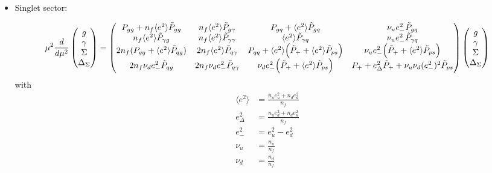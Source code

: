 \documentclass[a4paper,oneside]{article}
\begin{document}
\begin{itemize}
\item Singlet sector:

\begin{equation*}
\mu^2\frac{d}{d\mu^2}
\begin{pmatrix}
g \\
\gamma \\
\Sigma \\
\Delta_\Sigma
\end{pmatrix}
=
\begin{pmatrix}
 P_{gg}+n_f \langle e^2\rangle \tilde{P}_{gg} & n_f \langle e^2\rangle \tilde{P}_{g\gamma} & P_{gq} + \langle e^2\rangle \tilde{P}_{gq} & \nu_ue^2_-\tilde{P}_{gq} \\
 n_f \langle e^2\rangle \tilde{P}_{\gamma g} & n_f \langle e^2\rangle \tilde{P}_{\gamma \gamma} & \langle e^2\rangle \tilde{P}_{\gamma q} & \nu_ue^2_-\tilde{P}_{\gamma q} \\
 2n_f (P_{qg} +\langle e^2\rangle  \tilde{P}_{qg} )& 2 n_f \langle e^2\rangle  \tilde{P}_{q\gamma} & P_{qq}+ \langle e^2\rangle \Bigl(\tilde{P}_{+} + \langle e^2\rangle\tilde{P}_{ps}\Bigr)& \nu_ue^2_-\Bigl(\tilde{P}_{+}+ \langle e^2\rangle \tilde{P}_{ps} \Bigr)\\
 2n_f \nu_d e^2_-\tilde{P}_{qg} & 2n_f \nu_d e^2_-\tilde{P}_{q\gamma} & \nu_de^2_-\Bigl( \tilde{P}_{+} +  \langle e^2\rangle \tilde{P}_{ps} \Bigr)& P_+ +e_\Delta^2 \tilde{P}_{+} +\nu_u \nu_d (e^2_-)^2\tilde{P}_{ps}
\end{pmatrix}
\begin{pmatrix}
g \\
\gamma \\
\Sigma \\
\Delta_\Sigma
\end{pmatrix}
\end{equation*}
with
\begin{align*}
 \langle e^2\rangle&=\frac{n_u e_u^2+n_d e_d^2}{n_f} \\
e_\Delta^2&=\frac{n_u e_d^2+n_d e_u^2}{n_f} \\
e^2_-&= e_u^2 -e_d^2 \\
\nu_u &= \frac{n_u}{n_f}\\
\nu_d &= \frac{n_d}{n_f}
\end{align*}


\end{itemize}
\end{document}
